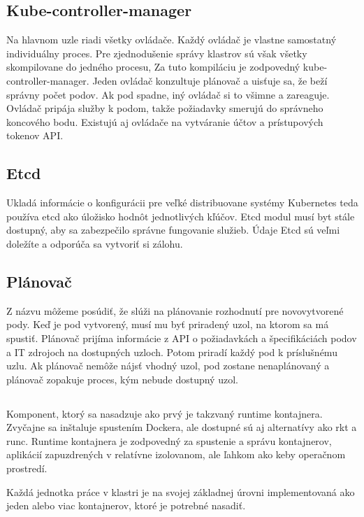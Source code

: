 \subsection*{Kube-controller-manager}
Na hlavnom uzle riadi všetky ovládače. Každý ovládač je vlastne samostatný individuálny proces. Pre zjednodušenie správy klastrov sú však všetky skompilovane do jedného procesu, Za tuto kompiláciu je zodpovedný kube-controller-manager. Jeden ovládač konzultuje plánovač a uisťuje sa, že beží správny počet podov. Ak pod spadne, iný ovládač si to všimne a zareaguje. Ovládač pripája služby k podom, takže požiadavky smerujú do správneho koncového bodu. Existujú aj ovládače na vytváranie účtov a prístupových tokenov API.\cite{kubecontroler}

\subsection*{Etcd}
Ukladá informácie o konfigurácii pre veľké distribuovane systémy  Kubernetes teda používa etcd ako úložisko hodnôt jednotlivých kľúčov. Etcd modul musí byt stále dostupný, aby sa zabezpečilo správne fungovanie služieb. Údaje Etcd sú veľmi doležíte a odporúča sa vytvoriť si zálohu. 

\subsection*{Plánovač}
Z názvu môžeme posúdiť, že slúži na plánovanie rozhodnutí pre novovytvorené pody. Keď je pod vytvorený, musí mu byť priradený uzol, na ktorom sa má spustiť. Plánovač prijíma informácie z API o požiadavkách a špecifikáciách podov a IT zdrojoch na dostupných uzloch. Potom priradí každý pod k príslušnému uzlu. Ak plánovač nemôže nájsť vhodný uzol, pod zostane nenaplánovaný a plánovač zopakuje proces, kým nebude dostupný uzol.

\subsection*{}
Komponent, ktorý sa nasadzuje ako prvý je takzvaný runtime kontajnera. Zvyčajne sa inštaluje spustením Dockera, ale dostupné sú aj alternatívy ako rkt a runc.
Runtime kontajnera je zodpovedný za spustenie a správu kontajnerov, aplikácií zapuzdrených v relatívne izolovanom, ale ľahkom ako keby operačnom prostredí. 

Každá jednotka práce v klastri je na svojej základnej úrovni implementovaná ako jeden alebo viac kontajnerov, ktoré je potrebné nasadiť. 

